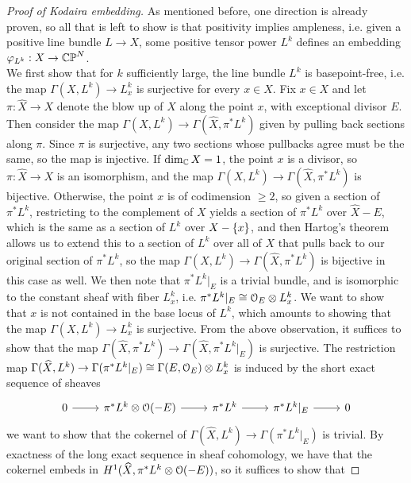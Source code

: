 \begin{proof}[Proof of Kodaira embedding]
As mentioned before, one direction is already proven, so all that is left
to show is that positivity implies ampleness, i.e. given a positive line
bundle $L \to X$, some positive tensor power $L^k$ defines an embedding
$\varphi_{L^k} : X \to \mathbb{CP}^N$. \\

We first show that for $k$ sufficiently large, the line bundle $L^k$ is
basepoint-free, i.e. the map $\Gamma(X,L^k) \to L^k_x$ is surjective for every
$x \in X$. Fix $x \in X$ and let $\pi : \widehat{X} \to X$ denote the blow up
of $X$ along the point $x$, with exceptional divisor $E$. Then consider
the map $\Gamma(X,L^k) \to \Gamma(\widehat{X}, \pi^*L^k)$ given by pulling
back sections along $\pi$. Since $\pi$ is surjective, any two sections whose
pullbacks agree must be the same, so the map is injective. If $\dim_{\mathbb{C}} X = 1$,
the point $x$ is a divisor, so $\pi : \widehat{X} \to X$ is an isomorphism,
and the map $\Gamma(X,L^k) \to \Gamma(\widehat{X}, \pi^*L^k)$ is bijective.
Otherwise, the point $x$ is of codimension $\geq 2$, so given a section
of $\pi^*L^k$, restricting to the complement of $X$ yields a
section of $\pi^*L^k$ over $\widehat{X} - E$, which is the same as a section of
$L^k$ over $X - \left\lbrace x \right\rbrace$, and then Hartog's theorem allows us to extend this
to a section of $L^k$ over all of $X$ that pulls back to our original section of
$\pi^*L^k$, so the map $\Gamma(X,L^k) \to \Gamma(\widehat{X}, \pi^*L^k)$ is
bijective in this case as well. We then note that $\pi^*L^k\vert_E$ is a
trivial bundle, and is isomorphic to the constant sheaf with fiber $L^k_x$,
i.e. $\pi^*L^k\vert_E \cong \mathcal{O}_E \otimes L^k_x$. We want to show that
$x$ is not contained in the base locus of $L^k$, which amounts to showing that
the map $\Gamma(X,L^k) \to L^k_x$ is surjective. From the above observation,
it suffices to show that the map
$\Gamma(\widehat{X},\pi^*L^k) \to \Gamma(\widehat{X},\pi^*L^k\vert_E)$ is surjective.
The restriction map
$\Gamma(\widehat{X},L^k) \to \Gamma(\pi^*L^k\vert_E) \cong \Gamma(E,\mathcal{O}_E) \otimes L^k_x$
is induced by the short exact sequence of sheaves
\[\begin{tikzcd}
0 \ar[r] & \pi^*L^k \otimes \O(-E) \ar[r] & \pi^*L^k \ar[r] & \pi^*L^k\vert_E
\ar[r] & 0
\end{tikzcd}\]
we want to show that the cokernel of
$\Gamma(\widehat{X},L^k) \to \Gamma(\pi^*L^k\vert_E)$ is trivial. By exactness
of the long exact sequence in sheaf cohomology, we have that the cokernel embeds
in $H^1(\widehat{X},\pi^*L^k\otimes\mathcal{O}(-E))$, so it suffices to show that

\end{proof}
